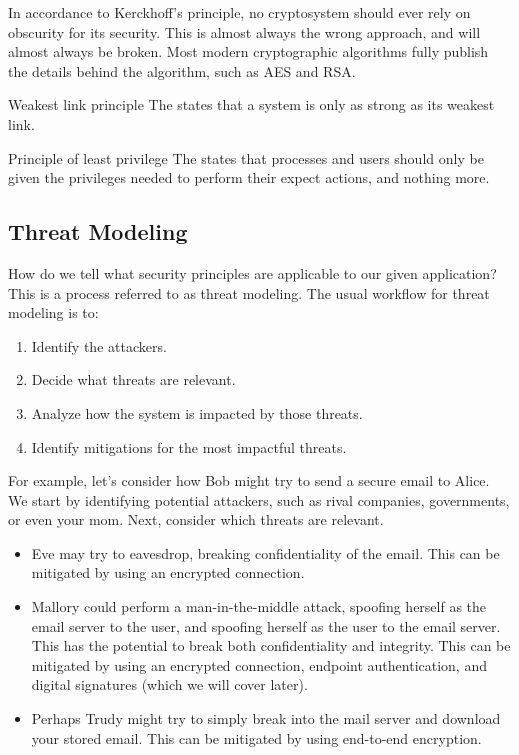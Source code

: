 In accordance to Kerckhoff's principle, no cryptosystem should ever rely on obscurity for its security. This is almost always the wrong approach, and will almost always be broken. Most modern cryptographic algorithms fully publish the details behind the algorithm, such as AES and RSA.

\begin{dfnbox}{Weakest link principle}{}
    The  states that a system is only as strong as its weakest link.
\end{dfnbox}

\begin{dfnbox}{Principle of least privilege}{}
    The  states that processes and users should only be given the privileges needed to perform their expect actions, and nothing more.
\end{dfnbox}

\subsection{Threat Modeling}
How do we tell what security principles are applicable to our given application? This is a process referred to as threat modeling. The usual workflow for threat modeling is to:

\begin{enumerate}
    \item Identify the attackers.
    \item Decide what threats are relevant.
    \item Analyze how the system is impacted by those threats.
    \item Identify mitigations for the most impactful threats.
\end{enumerate}

For example, let's consider how Bob might try to send a secure email to Alice. We start by identifying potential attackers, such as rival companies, governments, or even your mom. Next, consider which threats are relevant.
\begin{itemize}
    \item Eve may try to eavesdrop, breaking confidentiality of the email. This can be mitigated by using an encrypted connection.
    \item Mallory could perform a man-in-the-middle attack, spoofing herself as the email server to the user, and spoofing herself as the user to the email server. This has the potential to break both confidentiality and integrity. This can be mitigated by using an encrypted connection, endpoint authentication, and digital signatures (which we will cover later).
    \item Perhaps Trudy might try to simply break into the mail server and download your stored email. This can be mitigated by using end-to-end encryption.
\end{itemize}

